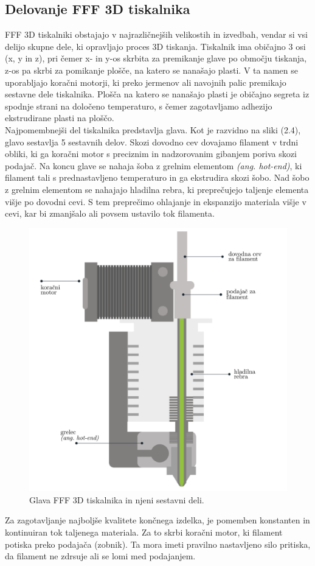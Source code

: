 \documentclass[12pt]{report}
\begin{document}
\subsection{Delovanje \ac{FFF} 3D tiskalnika}
\ac{FFF} 3D tiskalniki obstajajo v najrazličnejših velikostih in izvedbah, vendar si vsi delijo skupne dele, ki opravljajo proces 3D tiskanja. Tiskalnik ima običajno 3 osi (x, y in z), pri čemer x- in y-os skrbita za premikanje glave po
območju tiskanja, z-os pa skrbi za pomikanje plošče, na katero se nanašajo plasti. V ta namen se uporabljajo koračni motorji, ki preko jermenov ali navojnih palic premikajo sestavne dele tiskalnika. Plošča na katero se nanašajo plasti je običajno segreta iz spodnje strani na določeno temperaturo, s čemer zagotavljamo
adhezijo ekstrudirane plasti na ploščo. \\
Najpomembnejši del tiskalnika predstavlja glava. Kot je razvidno na sliki (2.4), glavo sestavlja 5 sestavnih delov. Skozi dovodno cev dovajamo filament v trdni obliki, ki ga koračni motor s preciznim in nadzorovanim gibanjem poriva skozi podajač. Na koncu glave se nahaja šoba z grelnim elementom \emph{(ang. hot-end)}, ki filament tali s prednastavljeno temperaturo
in ga ekstrudira skozi šobo. Nad šobo z grelnim elementom se nahajajo hladilna rebra, ki preprečujejo taljenje elementa višje po dovodni cevi. S tem preprečimo ohlajanje in ekspanzijo materiala višje v cevi, kar bi zmanjšalo ali povsem ustavilo tok filamenta.
\begin{figure}[H]
  \centering
  \includegraphics[scale=0.5]{Images/extruder.png}
  \caption{Glava FFF 3D tiskalnika in njeni sestavni deli. \cite{leapfrog}}
\end{figure}
\noindent Za zagotavljanje najboljše kvalitete končnega izdelka, je pomemben konstanten in kontinuiran tok taljenega materiala. Za to skrbi koračni motor, ki filament potiska preko
podajača (zobnik). Ta mora imeti pravilno nastavljeno silo pritiska, da filament ne zdrsuje ali se lomi med podajanjem. \cite{fff_article}
\end{document}
